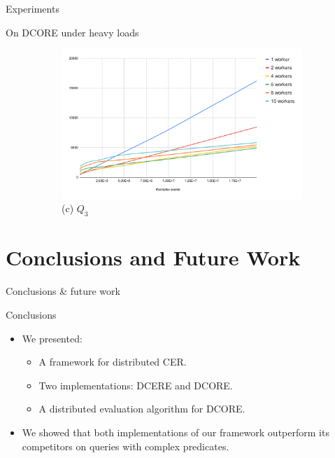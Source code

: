 \documentclass[xcolor=pdftex,dvipsnames,table]{beamer}
\begin{document}
\begin{frame}{Experiments}
\begin{block}{On DCORE under heavy loads}
\begin{figure}[H]
\begin{center}
\begin{subfigure}[b]{0.4\textwidth}
            \includegraphics[width=\textwidth]{experiment_4_chart_3}
            \tiny (c) $Q_{3}$
        \end{subfigure}
        \end{center}
    \end{figure}
  \end{block}
\end{frame}



\section{Conclusions and Future Work}

\begin{frame}{Conclusions \& future work}
  \begin{block}{Conclusions}
   \begin{itemize}
     \item We presented:
        \begin{itemize}
          \item A framework for distributed CER.
          \pause
          \item Two implementations: DCERE and DCORE.
          \pause
          \item A distributed evaluation algorithm for DCORE.
        \end{itemize}
     \pause
     \item We showed that both implementations of our framework outperform its competitors on queries with complex predicates.
   \end{itemize}
  \end{block}
\end{frame}
\end{document}
